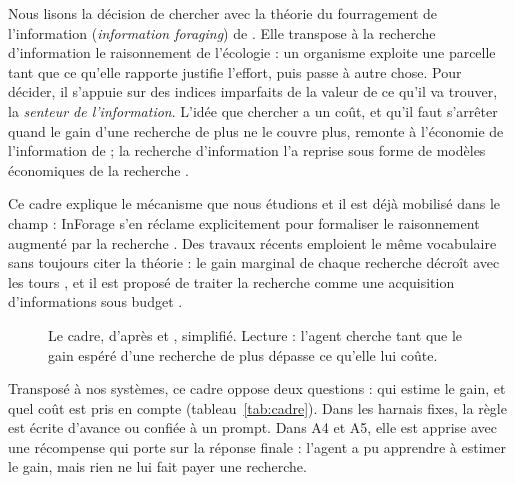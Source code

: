 \documentclass[11pt,a4paper]{article}
\begin{document}
Nous lisons la décision de chercher avec la théorie du fourragement de l'information (\emph{information foraging}) de \citet{pirolli1999information}. Elle transpose à la recherche d'information le raisonnement de l'écologie : un organisme exploite une parcelle tant que ce qu'elle rapporte justifie l'effort, puis passe à autre chose. Pour décider, il s'appuie sur des indices imparfaits de la valeur de ce qu'il va trouver, la \emph{senteur de l'information}. L'idée que chercher a un coût, et qu'il faut s'arrêter quand le gain d'une recherche de plus ne le couvre plus, remonte à l'économie de l'information de \citet{stigler1961economics} ; la recherche d'information l'a reprise sous forme de modèles économiques de la recherche \citep{azzopardi2011economics}.

Ce cadre explique le mécanisme que nous étudions et il est déjà mobilisé dans le champ : InForage s'en réclame explicitement pour formaliser le raisonnement augmenté par la recherche \citep{qian2025scent}. Des travaux récents emploient le même vocabulaire sans toujours citer la théorie : le gain marginal de chaque recherche décroît avec les tours \citep{zhang2026search}, et il est proposé de traiter la recherche comme une acquisition d'informations sous budget \citep{poudel2026reasoning}.

\begin{figure}[ht]
\centering
{}
\caption{Le cadre, d'après \citet{pirolli1999information} et \citet{stigler1961economics}, simplifié. Lecture : l'agent cherche tant que le gain espéré d'une recherche de plus dépasse ce qu'elle lui coûte.}
\label{fig:cadre}
\end{figure}

Transposé à nos systèmes, ce cadre oppose deux questions : qui estime le gain, et quel coût est pris en compte (tableau~\ref{tab:cadre}). Dans les harnais fixes, la règle est écrite d'avance ou confiée à un prompt. Dans A4 et A5, elle est apprise avec une récompense qui porte sur la réponse finale \citep{jin2025search} : l'agent a pu apprendre à estimer le gain, mais rien ne lui fait payer une recherche.
\end{document}
